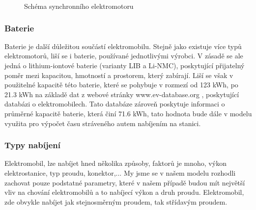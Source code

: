 \documentclass[a4paper,11pt]{article}
\begin{document}
\begin{figure}[H]
    \centering
    \caption{Schéma synchronního elektromotoru \cite{elektromotor}}
    \label{figure:synchroni-elektromotor}
\end{figure}

\subsubsection{Baterie}
\label{batteries}
Baterie je další důležitou součástí elektromobilu. Stejně jako existuje více typů elektromotorů, 
liší se i baterie, používané jednotlivými výrobci. V zásadě se ale jedná o lithium-iontové baterie
(varianty LIB a Li-NMC), poskytující přijatelný poměr mezi kapacitou, hmotností a prostorem, který 
zabírají.\cite{baterie_ev_wiki} Liší se však v použitelné kapacitě této baterie, které se pohybuje 
v rozmezí od 123 kWh, po 21.3 kWh na základě dat z webové stránky www.ev-database.org \cite{ev_database}, 
poskytující databázi o elektromobilech. Tato databáze zároveň poskytuje informaci o průměrné kapacitě
baterie, která činí 71.6 kWh, tato hodnota bude dále v modelu využita pro výpočet času stráveného autem
nabíjením na stanici.

\subsubsection{Typy nabíjení}
Elektromobil, lze nabíjet hned několika způsoby, faktorů je mnoho, výkon elektrostanice, typ proudu, 
konektor,... My jsme se v našem modelu rozhodli zachovat pouze podstatné parametry, které v našem 
případě budou mít největší vliv na chování elektromobilů a to nabíjecí výkon a druh proudu. 
Elektromobil, zde obvykle nabíjet jak stejnosměrným proudem, tak střídavým proudem.
\end{document}
